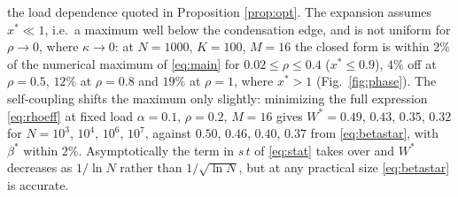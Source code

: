 \documentclass{SciPost}
\theoremstyle{plain}
\theoremstyle{definition}
\begin{document}
\begin{appendix}
the load dependence quoted in Proposition \ref{prop:opt}. The expansion assumes $x^*\ll1$, i.e.\ a maximum well below the condensation edge, and is not uniform for $\rho\to0$, where $\kappa\to0$: at $N=1000$, $K=100$, $M=16$ the closed form is within $2\%$ of the numerical maximum of \eqref{eq:main} for $0.02\le\rho\le0.4$ ($x^*\le0.9$), $4\%$ off at $\rho=0.5$, $12\%$ at $\rho=0.8$ and $19\%$ at $\rho=1$, where $x^*>1$ (Fig.\ \ref{fig:phase}). The self-coupling shifts the maximum only slightly: minimizing the full expression \eqref{eq:rhoeff} at fixed load $\alpha=0.1$, $\rho=0.2$, $M=16$ gives $W^*=0.49$, $0.43$, $0.35$, $0.32$ for $N=10^3$, $10^4$, $10^6$, $10^7$, against $0.50$, $0.46$, $0.40$, $0.37$ from \eqref{eq:betastar}, with $\beta^*$ within $2\%$. Asymptotically the term in $s\,t$ of \eqref{eq:stat} takes over and $W^*$ decreases as $1/\ln N$ rather than $1/\sqrt{\ln N}$, but at any practical size \eqref{eq:betastar} is accurate.


\end{appendix}
\end{document}
